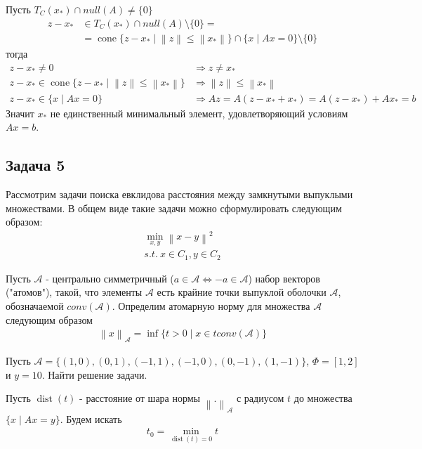 \documentclass{article}
\DeclareMathOperator{\cone}{cone}
\DeclareMathOperator{\dist}{dist}
\newcommand{\norm}[1]{\left\lVert#1\right\rVert}
\begin{document}
    Пусть $T_C(x_*) \cap null(A) \ne \{0\}$
    \begin{align*}
        z - x_* &\in T_C(x_*) \cap null(A) \setminus \{0\} =\\
        &= \cone \{z - x_* \mid \norm{z} \le \norm{x_*} \} \cap \{ x \mid Ax = 0 \} \setminus \{0\} 
    \end{align*}
    тогда 
    \begin{align*}
        z - x_* \ne 0 &\Rightarrow z \ne x_*\\
        z - x_* \in \cone \{z - x_* \mid \norm{z} \le \norm{x_*} \} &\Rightarrow \norm{z} \le \norm{x_*}\\
        z - x_* \in \{ x \mid Ax = 0 \} &\Rightarrow Az = A(z - x_* + x_*) = A(z - x_*) + Ax_* = b 
    \end{align*}
    Значит $x_*$ не единственный минимальный элемент, удовлетворяющий условиям $Ax = b$. 
    \bigbreak
    
    \subsection*{Задача 5}
    Рассмотрим задачи поиска евклидова расстояния между замкнутыми выпуклыми множествами. В общем виде такие задачи можно сформулировать следующим образом:
    \begin{align*}
        \min_{x, y} \norm{x - y}^2\\
        s.t. \: x \in C_1, y \in C_2
    \end{align*}
    
    Пусть $\mathcal{A}$ - центрально симметричный ($a \in \mathcal{A} \Leftrightarrow -a \in \mathcal{A}$) набор векторов ("атомов"), такой, что элементы $\mathcal{A}$ есть крайние точки выпуклой оболочки $\mathcal{A}$, обозначаемой $conv(\mathcal{A})$. Определим атомарную норму для множества $\mathcal{A}$ следующим образом
    \begin{align*}
        \norm{x}_{\mathcal{A}} = \inf \{ t > 0 \mid x \in t conv(\mathcal{A}) \}
    \end{align*}
    
    Пусть $\mathcal{A} = \{(1, 0), (0, 1), (-1, 1), (-1, 0), (0, -1), (1, -1) \}$, $\Phi = [1, 2]$ и $y = 10$. Найти решение задачи.
    \bigbreak
    
    Пусть $\dist(t)$ - расстояние от шара нормы $\norm{.}_{\mathcal{A}}$ с радиусом $t$ до множества $\{x \mid Ax = y\}$. Будем искать 
    \begin{align*}
        t_0 = \min_{  \dist(t) = 0 }{t}    
    \end{align*}
    
\end{document}
